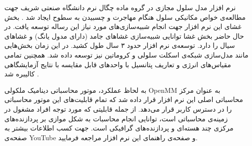 نرم افزار مدل سلول مجازی
در گروه ماده چگال نرم دانشگاه صنعتی شریف جهت مطالعه‌ی خواص مکانیکی سلول هنگام مهاجرت
و چسبیدن به سطوح
ایجاد شد
\cite{Tiam2017ACS, Tiam2018AFM}
. بخش غشای‌ این نرم افزار جهت انجام شبیه‌سازی‌های مورد نیاز این رساله توسعه یافت. در حال حاضر بخش غشا توانایی شبیه‌سازی غشا‌های جامد (دارای مدول یانگ) و غشاهای سیال را دارد. توسعه‌‌ی نرم افزار حدود ۳ سال طول کشید. در این زمان بخش‌هایی مانند مدل‌سازی شبکه‌ی اسکلت سلولی و کروماتین نیز توسعه داده شد. همچنین تمامی مقیاس‌های انرژی و تعاریف پتانسیل با واحد‌های قابل مقایسه با نتایج آزمایشگاهی کالیبره شد
\cite{VCMgit}
. 

به لحاظ عملکرد، موتور محاسباتی دینامیک ملکولی 
OpenMM
به عنوان مرکز محاسباتی اصلی این نرم افزار قرار داده شد که تمام قابلیت‌های این موتور محاسباتی را در دسترس کاربر قرار می‌دهد. از جمله قابلیتی که مورد توجه افراد مشغول در زمینه‌ی محاسباتی است، توانایی انجام محاسبات به شکل موازی بر پردازنده‌های مرکزی چند هسته‌ای
و پردازنده‌های گرافیکی
است. جهت کسب اطلاعات بیشتر به صفحه‌ی 
YouTube \cite{VCMYoutube}
و صفحه‌ی راهنمای این نرم افزار 
\cite{VCMhomepage}
مراجعه فرمایید.